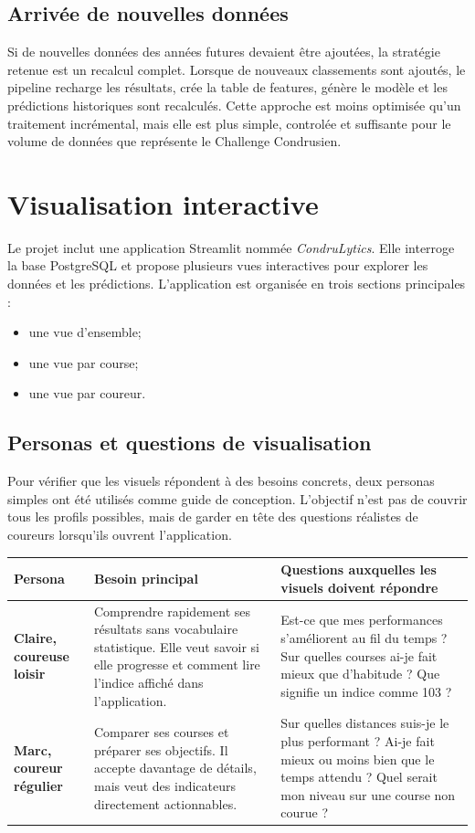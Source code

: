 \documentclass[12pt,a4paper]{article}
\begin{document}
\subsection{Arrivée de nouvelles données}

Si de nouvelles données des années futures devaient être ajoutées, la stratégie retenue est un recalcul complet. Lorsque de nouveaux classements sont ajoutés, le pipeline recharge les résultats, crée la table de features, génère le modèle et les prédictions historiques sont recalculés. Cette approche est moins optimisée qu'un traitement incrémental, mais elle est plus simple, controlée et suffisante pour le volume de données que représente le Challenge Condrusien.

\clearpage

\section{Visualisation interactive}

Le projet inclut une application Streamlit nommée \textit{CondruLytics}. Elle interroge la base PostgreSQL et propose plusieurs vues interactives pour explorer les données et les prédictions. L'application est organisée en trois sections principales :

\begin{itemize}
    \item une vue d'ensemble;
    \item une vue par course;
    \item une vue par coureur.
\end{itemize}

\subsection{Personas et questions de visualisation}

Pour vérifier que les visuels répondent à des besoins concrets, deux personas simples ont été utilisés comme guide de conception. L'objectif n'est pas de couvrir tous les profils possibles, mais de garder en tête des questions réalistes de coureurs lorsqu'ils ouvrent l'application.

\begin{longtable}{p{3.2cm}p{5.3cm}p{5.4cm}}
\toprule
\textbf{Persona} & \textbf{Besoin principal} & \textbf{Questions auxquelles les visuels doivent répondre} \\
\midrule
\textbf{Claire, coureuse loisir} & Comprendre rapidement ses résultats sans vocabulaire statistique. Elle veut savoir si elle progresse et comment lire l'indice affiché dans l'application. & Est-ce que mes performances s'améliorent au fil du temps ? Sur quelles courses ai-je fait mieux que d'habitude ? Que signifie un indice comme 103 ? \\
\textbf{Marc, coureur régulier} & Comparer ses courses et préparer ses objectifs. Il accepte davantage de détails, mais veut des indicateurs directement actionnables. & Sur quelles distances suis-je le plus performant ? Ai-je fait mieux ou moins bien que le temps attendu ? Quel serait mon niveau sur une course non courue ? \\
\bottomrule
\end{longtable}
\end{document}
